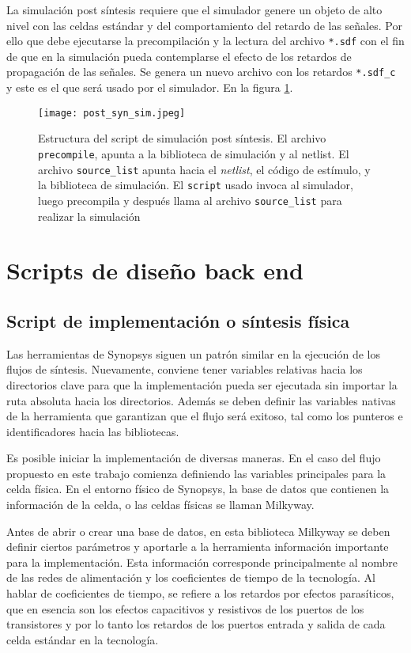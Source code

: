 La simulación post síntesis requiere que el simulador genere un objeto de alto nivel con las celdas estándar y del comportamiento del retardo de las señales. Por ello que debe ejecutarse la precompilación y la lectura del archivo \texttt{*.sdf} con el fin de que en la simulación pueda contemplarse el efecto de los retardos de propagación de las señales. Se genera un nuevo archivo con los retardos \texttt{*.sdf\_c} y este es el que será usado por el simulador. En la figura \ref{psyn_sim}.

\begin{figure}[h]
\texttt{[image: post\_syn\_sim.jpeg]}
\centering
\caption{Estructura del script de simulación post síntesis. El archivo \texttt{precompile}, apunta a la biblioteca de simulación y al netlist. El archivo \texttt{source\_list} apunta hacia el \textit{netlist}, el código de estímulo, y la biblioteca de simulación. El \texttt{script} usado invoca al simulador, luego precompila y después llama al archivo \texttt{source\_list} para realizar la simulación}
\label{psyn_sim}
\end{figure}

\section{Scripts de diseño back end}
\label{sec:phy_s}
\subsection{Script de implementación o síntesis física}
Las herramientas de Synopsys siguen un patrón similar en la ejecución de los flujos de síntesis. Nuevamente, conviene tener variables relativas hacia los directorios clave para que la implementación pueda ser ejecutada sin importar la ruta absoluta hacia los directorios. Además se deben definir las variables nativas de la herramienta que garantizan que el flujo será exitoso, tal como los punteros e identificadores hacia las bibliotecas.

Es posible iniciar la implementación de diversas maneras. En el caso del flujo propuesto en este trabajo comienza definiendo las variables principales para la celda física. En el entorno físico de Synopsys, la base de datos que contienen la información de la celda, o las celdas físicas se llaman Milkyway.

Antes de abrir o crear una base de datos, en esta biblioteca Milkyway se deben definir ciertos parámetros y aportarle a la herramienta información importante para la implementación. Esta información corresponde principalmente al nombre de las redes de alimentación y los coeficientes de tiempo de la tecnología. Al hablar de coeficientes de tiempo, se refiere a los retardos por efectos parasíticos, que en esencia son los efectos capacitivos y resistivos de los puertos de los transistores y por lo tanto los retardos de los puertos entrada y salida de cada celda estándar en la tecnología.

